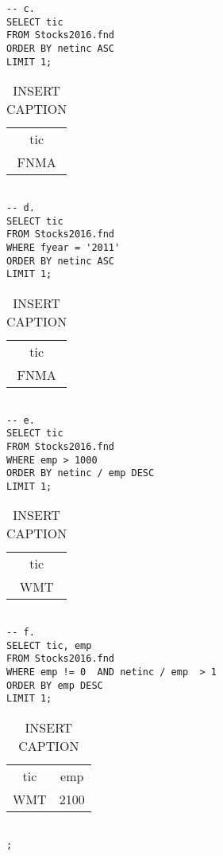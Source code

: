 \documentclass[12 pt]{article}
\begin{document}
\begin{flushleft}
\begin{verbatim}
-- c.
SELECT tic
FROM Stocks2016.fnd
ORDER BY netinc ASC
LIMIT 1; 
 \end{verbatim} 
\begin{table}[h] 
\centering 
\caption{INSERT CAPTION} 
\label{my - label} 
\begin{tabular}{c } 
 \\
tic\\
FNMA\\
\end{tabular} 
 \end{table} \begin{verbatim} 

-- d. 
SELECT tic
FROM Stocks2016.fnd
WHERE fyear = '2011'
ORDER BY netinc ASC
LIMIT 1; 
 \end{verbatim} 
\begin{table}[h] 
\centering 
\caption{INSERT CAPTION} 
\label{my - label} 
\begin{tabular}{c } 
 \\
tic\\
FNMA\\
\end{tabular} 
 \end{table} \begin{verbatim} 

-- e.
SELECT tic
FROM Stocks2016.fnd
WHERE emp > 1000 
ORDER BY netinc / emp DESC
LIMIT 1; 
 \end{verbatim} 
\begin{table}[h] 
\centering 
\caption{INSERT CAPTION} 
\label{my - label} 
\begin{tabular}{c } 
\\
tic\\
WMT\\
\end{tabular} 
 \end{table} \begin{verbatim} 

-- f.
SELECT tic, emp
FROM Stocks2016.fnd
WHERE emp != 0  AND netinc / emp  > 1
ORDER BY emp DESC
LIMIT 1; 
 \end{verbatim} 
\begin{table}[h] 
\centering 
\caption{INSERT CAPTION} 
\label{my - label} 
\begin{tabular}{c c } 
\\
tic & emp\\
WMT & 2100\\
\end{tabular} 
 \end{table} \begin{verbatim} 

; 
 \end{verbatim} 
\end{flushleft}
\end{document}
